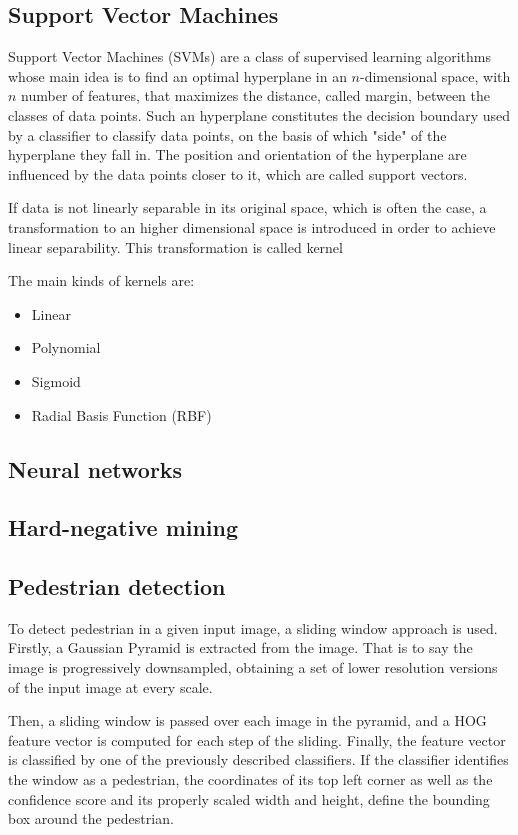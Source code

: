 \documentclass[journal,twocolumn]{IEEEtran}
\begin{document}
\subsection{Support Vector Machines}

Support Vector Machines (SVMs) are a class of supervised learning algorithms whose main idea is to find an optimal hyperplane in an $n$-dimensional space, with $n$ number of features, that maximizes the distance, called margin, between the classes of data points. Such an hyperplane constitutes the decision boundary used by a classifier to classify data points, on the basis of which "side" of the hyperplane they fall in. The position and orientation of the hyperplane are influenced by the data points closer to it, which are called support vectors.

If data is not linearly separable in its original space, which is often the case, a transformation to an higher dimensional space is introduced in order to achieve linear separability. This transformation is called kernel

The main kinds of kernels are:
\begin{itemize}
\item Linear 
\item Polynomial 
\item Sigmoid
\item Radial Basis Function (RBF)
\end{itemize}

\subsection{Neural networks}

\subsection{Hard-negative mining}

\subsection{Pedestrian detection}

To detect pedestrian in a given input image, a sliding window approach is used. Firstly, a Gaussian Pyramid is extracted
from the image. That is to say the image is progressively
downsampled, obtaining a set of lower resolution versions of the input image at every scale.

Then, a sliding window is passed over each image in the
pyramid, and a HOG feature vector is computed for each step
of the sliding.
Finally, the feature vector is classified by one of the
previously described classifiers. If the classifier identifies the
window as a pedestrian, the coordinates of its top left corner
as well as the confidence score and its properly scaled width
and height, define the bounding box around the pedestrian.
\end{document}
